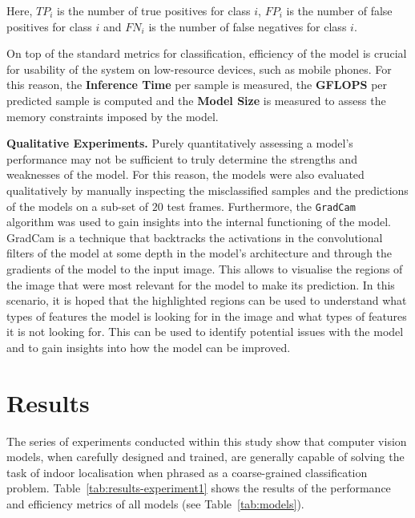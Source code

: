 \documentclass[a4paper]{article}
\begin{document}
  Here, $TP_i$ is the number of true positives for class $i$, $FP_i$ is the
  number of false positives for class $i$ and $FN_i$ is the number of false
  negatives for class $i$. 

  On top of the standard metrics for classification, efficiency of the model is
  crucial for usability of the system on low-resource devices, such as mobile
  phones. For this reason, the \textbf{Inference Time} per sample is measured, 
  the \textbf{GFLOPS} per predicted sample is computed and the \textbf{Model
  Size} is measured to assess the memory constraints imposed by the model.

  \textbf{Qualitative Experiments.} Purely quantitatively assessing a model's
  performance may not be sufficient to truly determine the strengths and
  weaknesses of the model. For this reason, the models were also evaluated
  qualitatively by manually inspecting the misclassified samples and
  the predictions of the models on a sub-set of $20$ test frames. 
  Furthermore, the \texttt{GradCam}~\cite{gradcam} algorithm was used to gain 
  insights into the internal functioning of the model. GradCam is a technique
  that backtracks the activations in the convolutional filters of the model at
  some depth in the model's architecture and through the gradients of the model
  to the input image. This allows to visualise the regions of the image that
  were most relevant for the model to make its prediction. In this scenario, it
  is hoped that the highlighted regions can be used to understand what types of
  features the model is looking for in the image and what types of features it
  is not looking for. This can be used to identify potential issues with the
  model and to gain insights into how the model can be improved.



  \section{Results} %
  \label{sec:results}


  The series of experiments conducted within this study show that computer
  vision models, when carefully designed and trained, are generally capable of
  solving the task of indoor localisation when phrased as a coarse-grained
  classification problem. Table~\ref{tab:results-experiment1} shows the results
  of the performance and efficiency metrics of all models (see
  Table~\ref{tab:models}).
\end{document}
